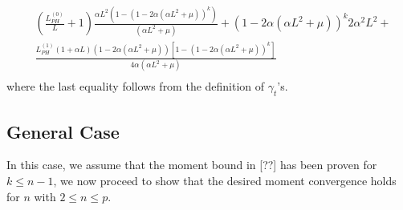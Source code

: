 \documentclass[a4paper]{article}
\begin{document}
\begin{equation}
\begin{split}
		& \left(\frac{L_{PH}^{(0)}}{L} + 1\right)\frac{\alpha L^{2}\left(1 - \left(1 - 2\alpha\left(\alpha L^{2} + \mu\right)\right)^{k}\right)}{\left(\alpha L^{2} + \mu\right)} + \left(1 - 2\alpha\left(\alpha L^{2} + \mu\right)\right)^{k}2\alpha^{2}L^{2} +\\
		& \frac{L_{PH}^{(1)}\left(1 + \alpha L\right)\left(1 - 2\alpha\left(\alpha L^{2} + \mu\right)\right)\left[1 - \left(1 - 2\alpha\left(\alpha L^{2} + \mu\right)\right)^{k}\right]}{4\alpha\left(\alpha L^{2} + \mu\right)}\\
	\end{split}
\end{equation}
where the last equality follows from the definition of $\gamma_{t}$'s.

\subsection{General Case}
In this case, we assume that the moment bound in [??] has been proven for $k \le n - 1$, we now proceed to show that the desired moment convergence holds for $n$ with $2 \le n \le p$.
\end{document}
